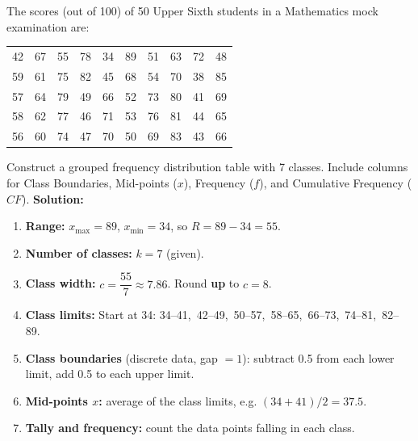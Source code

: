 \documentclass[11pt]{article}
\begin{document}
\begin{exoresolu}
The scores (out of 100) of 50 Upper Sixth students in a Mathematics mock examination are:
\begin{center}
\begin{tabular}{cccccccccc}
42 & 67 & 55 & 78 & 34 & 89 & 51 & 63 & 72 & 48 \\
59 & 61 & 75 & 82 & 45 & 68 & 54 & 70 & 38 & 85 \\
57 & 64 & 79 & 49 & 66 & 52 & 73 & 80 & 41 & 69 \\
58 & 62 & 77 & 46 & 71 & 53 & 76 & 81 & 44 & 65 \\
56 & 60 & 74 & 47 & 70 & 50 & 69 & 83 & 43 & 66
\end{tabular}
\end{center}
Construct a grouped frequency distribution table with 7 classes. Include columns for Class Boundaries, Mid-points ($x$), Frequency ($f$), and Cumulative Frequency ($CF$).
\tcblower
\textbf{Solution:}
\begin{enumerate}
    \item \textbf{Range:} $x_{\max} = 89$, $x_{\min} = 34$, so $R = 89 - 34 = 55$.
    \item \textbf{Number of classes:} $k = 7$ (given).
    \item \textbf{Class width:} $c = \dfrac{55}{7} \approx 7.86$. Round \textbf{up} to $c = 8$.
    \item \textbf{Class limits:} Start at 34:
    34--41,\ 42--49,\ 50--57,\ 58--65,\ 66--73,\ 74--81,\ 82--89.
    \item \textbf{Class boundaries} (discrete data, gap $=1$): subtract 0.5 from each lower limit, add 0.5 to each upper limit.
    \item \textbf{Mid-points $x$:} average of the class limits, e.g. $(34+41)/2 = 37.5$.
    \item \textbf{Tally and frequency:} count the data points falling in each class.
\end{enumerate}


\end{exoresolu}
\end{document}
